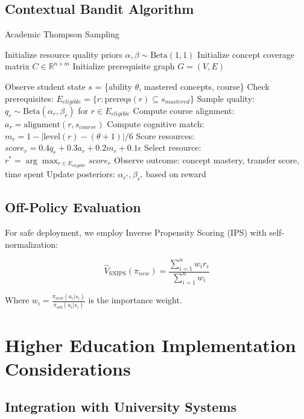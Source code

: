 \documentclass[11pt,a4paper]{report}
\begin{document}
\section{Contextual Bandit Algorithm}

\begin{algorithm}
\caption{Academic Thompson Sampling}
\label{alg:thompson}
\begin{algorithmic}[1]
\STATE Initialize resource quality priors $\alpha, \beta \sim \text{Beta}(1,1)$
\STATE Initialize concept coverage matrix $C \in \mathbb{R}^{n \times m}$
\STATE Initialize prerequisite graph $G = (V, E)$

    \STATE Observe student state $s$ = \{ability $\theta$, mastered concepts, course\}
    \STATE Check prerequisites: $E_{eligible} = \{r : \text{prereqs}(r) \subseteq s_{mastered}\}$
    \STATE Sample quality: $q_r \sim \text{Beta}(\alpha_r, \beta_r)$ for $r \in E_{eligible}$
    \STATE Compute course alignment: $a_r = \text{alignment}(r, s_{course})$
    \STATE Compute cognitive match: $m_r = 1 - |\text{level}(r) - (\theta + 1)|/6$
    \STATE Score resources: $score_r = 0.4q_r + 0.3a_r + 0.2m_r + 0.1\epsilon$
    \STATE Select resource: $r^* = \arg\max_{r \in E_{eligible}} score_r$
    \STATE Observe outcome: concept mastery, transfer score, time spent
    \STATE Update posteriors: $\alpha_{r^*}, \beta_{r^*}$ based on reward
\ENDWHILE
\end{algorithmic}
\end{algorithm}

\section{Off-Policy Evaluation}

For safe deployment, we employ Inverse Propensity Scoring (IPS) with self-normalization:

\begin{equation}
\hat{V}_{\text{SNIPS}}(\pi_{new}) = \frac{\sum_{i=1}^n w_i r_i}{\sum_{i=1}^n w_i}
\end{equation}

Where $w_i = \frac{\pi_{new}(a_i|s_i)}{\pi_{old}(a_i|s_i)}$ is the importance weight.

\chapter{Higher Education Implementation Considerations}

\section{Integration with University Systems}
\end{document}
